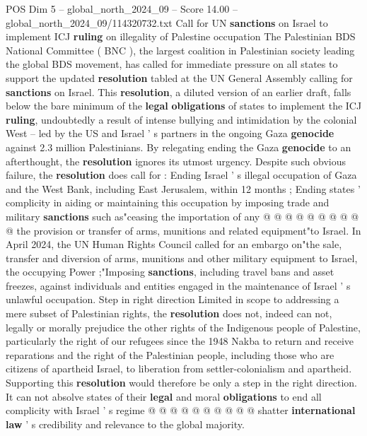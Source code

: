 \begin{textsample}{POS Dim 5 – global\_north\_2024\_09 – Score 14.00 – global\_north\_2024\_09/114320732.txt}  \label{ex:f5_pos_316}
Call for UN \textbf{sanctions} on Israel to implement ICJ \textbf{ruling} on illegality of Palestine occupation The Palestinian BDS National Committee ( BNC ), the largest coalition in Palestinian society leading the global BDS movement, has called for immediate pressure on all states to support the updated \textbf{resolution} tabled at the UN General Assembly calling for \textbf{sanctions} on Israel.
This \textbf{resolution}, a diluted version of an earlier draft, falls below the bare minimum of the \textbf{legal} \textbf{obligations} of states to implement the ICJ \textbf{ruling}, undoubtedly a result of intense bullying and intimidation by the colonial West -- led by the US and Israel ' s partners in the ongoing Gaza \textbf{genocide} against 2.3 million Palestinians.
By relegating ending the Gaza \textbf{genocide} to an afterthought, the \textbf{resolution} ignores its utmost urgency.
Despite such obvious failure, the \textbf{resolution} does call for : Ending Israel ' s illegal occupation of Gaza and the West Bank, including East Jerusalem, within 12 months ; Ending states ' complicity in aiding or maintaining this occupation by imposing trade and military \textbf{sanctions} such as"ceasing the importation of any @ @ @ @ @ @ @ @ @ @ the provision or transfer of arms, munitions and related equipment"to Israel.
In April 2024, the UN Human Rights Council called for an embargo on"the sale, transfer and diversion of arms, munitions and other military equipment to Israel, the occupying Power ;"Imposing \textbf{sanctions}, including travel bans and asset freezes, against individuals and entities engaged in the maintenance of Israel ' s unlawful occupation.
Step in right direction Limited in scope to addressing a mere subset of Palestinian rights, the \textbf{resolution} does not, indeed can not, legally or morally prejudice the other rights of the Indigenous people of Palestine, particularly the right of our refugees since the 1948 Nakba to return and receive reparations and the right of the Palestinian people, including those who are citizens of apartheid Israel, to liberation from settler-colonialism and apartheid.
Supporting this \textbf{resolution} would therefore be only a step in the right direction.
It can not absolve states of their \textbf{legal} and moral \textbf{obligations} to end all complicity with Israel ' s regime @ @ @ @ @ @ @ @ @ @ shatter \textbf{international} \textbf{law} ' s credibility and relevance to the global majority.

\end{textsample}
